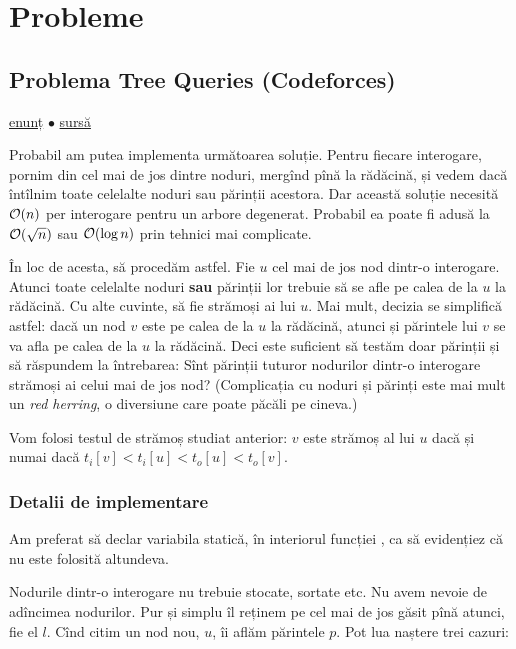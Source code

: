 \documentclass[../main.tex]{subfiles}
\begin{document}
\section{Probleme}

\subsection{Problema Tree Queries (Codeforces)}
\label{problem:tree-queries}

\href{https://codeforces.com/contest/1328/problem/E}{enunț}
$\bullet$
\hyperref[code:tree-queries]{sursă}

Probabil am putea implementa următoarea soluție. Pentru fiecare interogare, pornim din cel mai de jos dintre noduri, mergînd pînă la rădăcină, și vedem dacă întîlnim toate celelalte noduri sau părinții acestora. Dar această soluție necesită $\mathcal{O}(n)$ per interogare pentru un arbore degenerat. Probabil ea poate fi adusă la $\mathcal{O}(\sqrt{n})$ sau $\mathcal{O}(\log n)$ prin tehnici mai complicate.

În loc de acesta, să procedăm astfel. Fie $u$ cel mai de jos nod dintr-o interogare. Atunci toate celelalte noduri \textbf{sau} părinții lor trebuie să se afle pe calea de la $u$ la rădăcină. Cu alte cuvinte, să fie strămoși ai lui $u$. Mai mult, decizia se simplifică astfel: dacă un nod $v$ este pe calea de la $u$ la rădăcină, atunci și părintele lui $v$ se va afla pe calea de la $u$ la rădăcină. Deci este suficient să testăm doar părinții și să răspundem la întrebarea: Sînt părinții tuturor nodurilor dintr-o interogare strămoși ai celui mai de jos nod? (Complicația cu noduri și părinți este mai mult un \textit{red herring}, o diversiune care poate păcăli pe cineva.)

Vom folosi testul de strămoș studiat anterior: $v$ este strămoș al lui $u$ dacă și numai dacă $t_i[v] < t_i[u] < t_o[u] < t_o[v]$.

\subsubsection*{Detalii de implementare}

Am preferat să declar variabila  statică, în interiorul funcției , ca să evidențiez că nu este folosită altundeva.

Nodurile dintr-o interogare nu trebuie stocate, sortate etc. Nu avem nevoie de adîncimea nodurilor. Pur și simplu îl reținem pe cel mai de jos găsit pînă atunci, fie el $l$. Cînd citim un nod nou, $u$, îi aflăm părintele $p$. Pot lua naștere trei cazuri:
\end{document}
